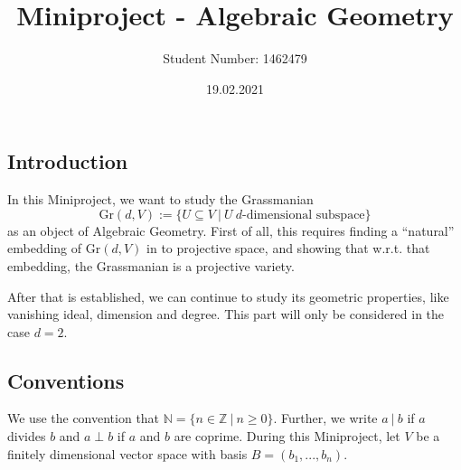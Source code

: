 \documentclass{scrartcl}
\title{Miniproject - Algebraic Geometry}
\author{Student Number: 1462479}
\date{19.02.2021}
\newcommand{\N}{\mathbb{N}}
\newcommand{\Z}{\mathbb{Z}}
\newcommand{\Gr}{\mathrm{Gr}}
\newcommand{\divides}{\ | \ }
\theoremstyle{definition}
\begin{document}
\maketitle

\subsection*{Introduction}

In this Miniproject, we want to study the Grassmanian
\begin{equation*}
    \Gr(d, V) := \{ U \subseteq V \ | \ U \ \text{$d$-dimensional subspace} \}
\end{equation*}
as an object of Algebraic Geometry.
First of all, this requires finding a ``natural'' embedding of $\Gr(d, V)$ in to projective space, and showing that w.r.t. that embedding, the Grassmanian is a projective variety.

After that is established, we can continue to study its geometric properties, like vanishing ideal, dimension and degree.
This part will only be considered in the case $d = 2$.

\subsection*{Conventions}
We use the convention that $\N = \{ n \in \Z \ | \ n \geq 0 \}$.
Further, we write $a \divides b$ if $a$ divides $b$ and $a \perp b$ if $a$ and $b$ are coprime.
During this Miniproject, let $V$ be a finitely dimensional vector space with basis $B = (b_1, ..., b_n)$.
\end{document}
